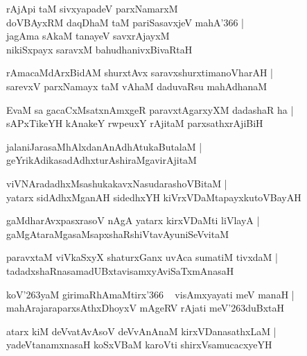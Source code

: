 \documentclass[twoside,12pt,openright]{book}
\def\S{\char'263}
\newcounter{shloka}[chapter]
\begin{document}
\begin{shloka}%
rAjApi taM sivxyapadeV parxNamarxM \\
doVBAyxRM daqDhaM taM pariSasavxjeV mahA\char'366 |\\
jagAma sAkaM tanayeV savxrAjayxM \\
nikiSxpayx saravxM bahudhanivxBivaRtaH
\end{shloka}

\begin{shloka}%
rAmacaMdArxBidAM shurxtAvx saravxshurxtimanoVharAH |\\
sarevxV parxNamayx taM vAhaM daduvaRsu mahAdhanaM 
\end{shloka}

\begin{shloka}%
EvaM sa gacaCxMsatxnAmxgeR paravxtAgarxyXM dadashaR ha |\\
sAPxTikeYH kAnakeY rwpeuxY rAjitaM parxsathxrAjiBiH
\end{shloka}

\begin{shloka}%
jalaniJarasaMhAlxdanAnAdhAtukaButalaM |\\
geYrikAdikasadAdhxturAshiraMgavirAjitaM 
\end{shloka}

\begin{shloka}%
viVNAradadhxMsashukakavxNasudarashoVBitaM |\\
yatarx sidAdhxMganAH sidedhxYH kiVrxVDaMtapayxkutoVBayAH 
\end{shloka}

\begin{shloka}%
gaMdharAvxpasxrasoV nAgA yatarx kirxVDaMti liVlayA |\\
gaMgAtaraMgasaMsapxshaRshiVtavAyuniSeVvitaM 
\end{shloka}

\begin{shloka}%
paravxtaM viVkaSxyX shaturxGanx uvAca sumatiM tivxdaM |\\
tadadxshaRnasamadUBxtavisamxyAviSaTxmAnasaH 
\end{shloka}

\begin{shloka}%
koV\S yaM  girimaRhAmaMtirx\char'366 ~ visAmxyayati meV manaH |\\
mahArajaraparxsAthxDhoyxV mAgeRV rAjati meV\S duBxtaH
\end{shloka}

\begin{shloka}%
atarx kiM deVvatAvAsoV deVvAnAnaM  kirxVDanasathxLaM |\\
yadeVtanamxnasaH koSxVBaM karoVti shirxVsamucacxyeYH
\end{shloka}
\end{document}
